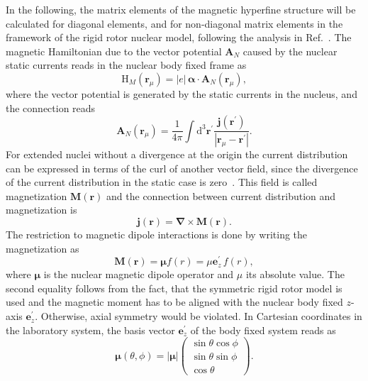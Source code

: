 In the following, the matrix elements of the magnetic hyperfine structure will be calculated for diagonal elements, and for non-diagonal matrix elements in the framework of the rigid rotor nuclear model, following the analysis in Ref.~\cite{Steffen1985}. The magnetic Hamiltonian due to the vector potential $\mathbf{A}_N$ caused by the nuclear static currents reads in the nuclear body fixed frame as
\begin{equation}
\label{eq:Hmag_rot}
\text{H}_{M}(\mathbf{r}_\mu) = |e|\,\boldsymbol{\alpha}\cdot \mathbf{A}_N(\mathbf{r}_\mu),
\end{equation}
where the vector potential is generated by the static currents in the nucleus, and the connection reads~\cite{jackson1999}
\begin{equation}
\mathbf{A}_N(\mathbf{r}_\mu) = \frac{1}{4\pi}\int\text{d}^3\mathbf{r}^\prime \frac{\mathbf{j}(\mathbf{r}^\prime)}{|\mathbf{r}_\mu-\mathbf{r}^\prime|}.
\end{equation}
For extended nuclei without a divergence at the origin the current distribution can be expressed in terms of the curl of another vector field, since the divergence of the current distribution in the static case is zero~\cite{jackson1999}. This field is called magnetization $\mathbf{M}(\mathbf{r})$ and the connection between current distribution and magnetization is
\begin{equation}
\mathbf{j}(\mathbf{r}) = \boldsymbol{\nabla} \times  \mathbf{M}(\mathbf{r}).
\end{equation}
The restriction to magnetic dipole interactions is done by writing the magnetization as
\begin{equation}
\mathbf{M}(\mathbf{r})=\boldsymbol{\mu}f(r)=\mu\mathbf{e}_z^\prime\,f(r),
\end{equation}
where $\boldsymbol{\mu}$ is the nuclear magnetic dipole operator and $\mu$ its absolute value. The second equality follows from the fact, that the symmetric rigid rotor model is used and the magnetic moment has to be aligned with the nuclear body fixed $z$-axis $\mathbf{e}_z^\prime$. Otherwise, axial symmetry would be violated.
In Cartesian coordinates in the laboratory system, the basis vector $\mathbf{e}_z^\prime$ of the body fixed system reads as
\begin{equation}
\label{eq:magMomOp}
\boldsymbol{\mu}(\theta,\phi)=|\boldsymbol{\mu}|
\begin{pmatrix}
\sin\theta\cos\phi \\ \sin\theta\sin\phi \\ \cos\theta
\end{pmatrix}.
\end{equation}
